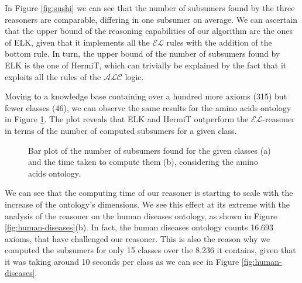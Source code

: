 \documentclass[a4paper]{article}
\theoremstyle{plain}
\theoremstyle{definition}
\begin{document}
    In Figure \ref{fig:sushi} we can see that the number of subsumers found by the three reasoners are comparable, differing in one subsumer on average. We can ascertain that the upper bound of the reasoning capabilities of our algorithm are the ones of ELK, given that it implements all the $\mathcal{EL}$ rules with the addition of the bottom rule. In turn, the upper bound of the number of subsumers found by ELK is the one of HermiT, which can trivially be explained by the fact that it exploits all the rules of the $\mathcal{ALC}$ logic.

    Moving to a knowledge base containing over a hundred more axioms (315) but fewer classes (46), we can observe the same results for the amino acids ontology in Figure \ref{fig:amino-acids}. The plot reveals that ELK and HermiT outperform the $\mathcal{EL}$-reasoner in terms of the number of computed subsumers for a given class.
    
    \begin{figure}[h!]
        \centering
        \hspace{5mm} %
        \caption{Bar plot of the number of subsumers found for the given classes (a) and the time taken to compute them (b), considering the amino acids ontology.}
        \label{fig:amino-acids}
    \end{figure}
    We can see that the computing time of our reasoner is starting to scale with the increase of the ontology's dimensions.
    We see this effect at its extreme with the analysis of the reasoner on the human diseases ontology, as shown in Figure \ref{fig:human-diseases}(b).
    In fact, the human diseases ontology counts 16.693 axioms, that have challenged our reasoner. This is also the reason why we computed the subsumers for only 15 classes over the 8.236 it contains, given that it was taking around 10 seconds per class as we can see in Figure \ref{fig:human-diseases}.
\end{document}
